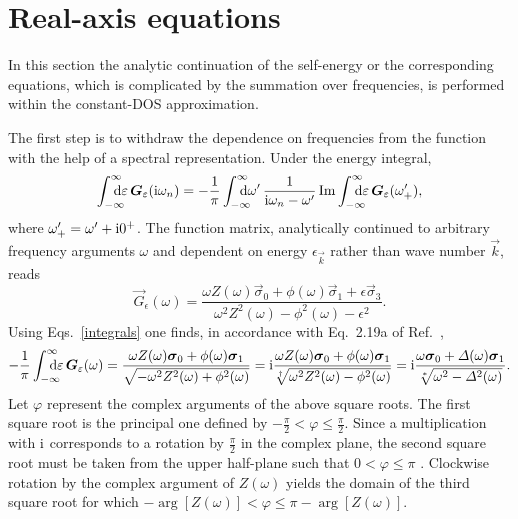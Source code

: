 \section{Real-axis equations}

In this section the analytic continuation of the self-energy or the
corresponding  equations, which is complicated by the summation
over  frequencies, is performed within the constant-DOS
approximation.

The first step is to withdraw the dependence on  frequencies
from the  function with the help of a spectral representation. Under
the energy integral,
%
\begin{equation*}
    \int \from{-\infty} \till \infty \D \epsilon \, \vec G_\epsilon(\I \omega_n)
    = -\frac 1 \pi
    \int \from{-\infty} \till \infty \D \omega' \,
    \frac 1 {\I \omega_n - \omega'}
    \Im \int \from{-\infty} \till \infty \D \epsilon \,
    \vec G_\epsilon(\omega'_+),
\end{equation*}
%
where $\omega'_+ = \omega' + \mathrm i 0^+$. The  function matrix,
analytically continued to arbitrary frequency arguments $\omega$ and dependent
on energy $\epsilon_{\vec k}$ rather than wave number $\vec k$, reads
%
\begin{equation*}
    \vec G_\epsilon(\omega) = \frac
        { \omega Z(\omega) \vec \sigma_0
        + \phi(\omega) \vec \sigma_1
        + \epsilon \vec \sigma_3 }
        { \omega^2 Z^2(\omega)
        - \phi^2(\omega)
        - \epsilon^2}.
\end{equation*}
%
Using Eqs.~\ref{integrals} one finds, in accordance with Eq.~2.19a of
Ref.~,
%
\begin{equation*}
    -\frac 1 \pi \int \from{-\infty} \till \infty \D \epsilon \,
    \vec G_\epsilon(\omega)
    = \frac
        {\omega Z(\omega) \vec \sigma_0 + \phi(\omega) \vec \sigma_1}
        {\sqrt{-\omega^2 Z^2(\omega) + \phi^2(\omega)}}
    = \I \frac
        {\omega Z(\omega) \vec \sigma_0 + \phi(\omega) \vec \sigma_1}
        {\sqrt[\dagger]{\omega^2 Z^2(\omega) - \phi^2(\omega)}}
    = \I \frac
        {\omega \vec \sigma_0 + \Delta(\omega) \vec \sigma_1}
        {\sqrt[*]{\omega^2 - \Delta^2(\omega)}}.
\end{equation*}
%
Let $\varphi$ represent the complex arguments of the above square roots. The
first square root is the principal one defined by $-\frac \pi 2 < \varphi \leq
\frac \pi 2$. Since a multiplication with $\mathrm i$ corresponds to a rotation by
$\frac \pi 2$ in the complex plane, the second square root must be taken from
the upper half-plane such that $0 < \varphi \leq \pi$
\cite[Eq.~2.19b]{ScalapinoSchriefferWilkins66}. Clockwise rotation by the
complex argument of $Z(\omega)$ yields the domain of the third square root for
which $-\arg[Z(\omega)] < \varphi \leq \pi - \arg[Z(\omega)]$.

